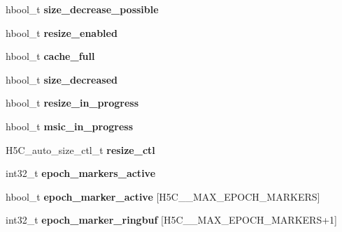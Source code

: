 \begin{DoxyCompactItemize}
\item 
\mbox{\label{struct_h5_c__t_a08bdd65b220fd7db1f25b9de3adeb6e4}} 
hbool\+\_\+t {\bfseries size\+\_\+decrease\+\_\+possible}
\item 
\mbox{\label{struct_h5_c__t_a9a1ca601d81577bd09703b3925fa53f4}} 
hbool\+\_\+t {\bfseries resize\+\_\+enabled}
\item 
\mbox{\label{struct_h5_c__t_a9be3fcae63a6c9559b9421261c4229b9}} 
hbool\+\_\+t {\bfseries cache\+\_\+full}
\item 
\mbox{\label{struct_h5_c__t_a091906ba62b457b379884784ff1f58df}} 
hbool\+\_\+t {\bfseries size\+\_\+decreased}
\item 
\mbox{\label{struct_h5_c__t_a0ac301af0d2574350f9651ecb4ee3f6a}} 
hbool\+\_\+t {\bfseries resize\+\_\+in\+\_\+progress}
\item 
\mbox{\label{struct_h5_c__t_a892ca8463c2244e56d236af4f180a6dc}} 
hbool\+\_\+t {\bfseries msic\+\_\+in\+\_\+progress}
\item 
\mbox{\label{struct_h5_c__t_a7093d9a2880538e0b30647d4bea196b6}} 
H5\+C\+\_\+auto\+\_\+size\+\_\+ctl\+\_\+t {\bfseries resize\+\_\+ctl}
\item 
\mbox{\label{struct_h5_c__t_ae29bccea3edea16ce71369ad28cfdb96}} 
int32\+\_\+t {\bfseries epoch\+\_\+markers\+\_\+active}
\item 
\mbox{\label{struct_h5_c__t_a57b5eb5a63d8121687b3170153a69be8}} 
hbool\+\_\+t {\bfseries epoch\+\_\+marker\+\_\+active} \mbox{[}H5\+C\+\_\+\+\_\+\+M\+A\+X\+\_\+\+E\+P\+O\+C\+H\+\_\+\+M\+A\+R\+K\+E\+RS\mbox{]}
\item 
\mbox{\label{struct_h5_c__t_a9385f502230b40af07ac1f94085faa89}} 
int32\+\_\+t {\bfseries epoch\+\_\+marker\+\_\+ringbuf} \mbox{[}H5\+C\+\_\+\+\_\+\+M\+A\+X\+\_\+\+E\+P\+O\+C\+H\+\_\+\+M\+A\+R\+K\+E\+RS+1\mbox{]}
\item 
\mbox{\label{struct_h5_c__t_a1de698a8f3c396aa5285ff61f61b718a}} 

\end{DoxyCompactItemize}
